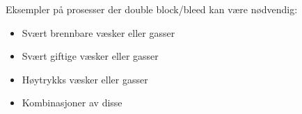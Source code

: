 





Eksempler på prosesser der double block/bleed kan være nødvendig:

\begin{itemize}
\goodbreak
\item{} Svært brennbare væsker eller gasser
\item{} Svært giftige væsker eller gasser
\item{} Høytrykks væsker eller gasser
\item{} Kombinasjoner av disse
\end{itemize}



